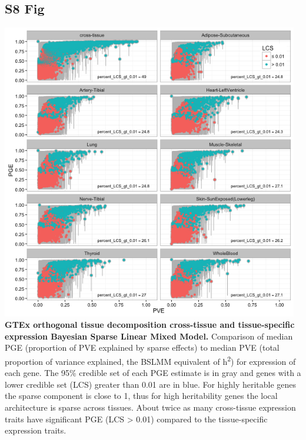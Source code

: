 \documentclass[10pt,letterpaper]{article}
\begin{document}
\begin{singlespace}
\subsection*{S8 Fig}
\includegraphics[width=13cm]{Figures/GenArch_Supp/S5Fig.png}
\label{S8_Fig}
{\bf GTEx orthogonal tissue decomposition cross-tissue and tissue-specific expression Bayesian Sparse Linear Mixed Model.} Comparison of median PGE (proportion of PVE explained by sparse effects) to median PVE (total proportion of variance explained, the BSLMM equivalent of h\textsuperscript{2}) for expression of each gene. The 95\% credible set of each PGE estimate is in gray and genes with a lower credible set (LCS) greater than 0.01 are in blue. For highly heritable genes the sparse component is close to 1, thus for high heritability genes the local architecture is sparse across tissues. About twice as many cross-tissue expression traits have significant PGE (LCS \textgreater{} 0.01) compared to the tissue-specific expression traits.


\end{singlespace}
\end{document}
